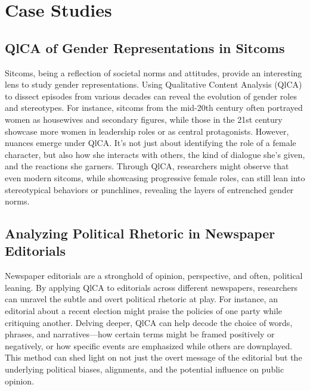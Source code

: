 \documentclass[
  b5paper]{book}
\begin{document}
\hypertarget{case-studies-2}{%
\section{Case Studies}\label{case-studies-2}}

\hypertarget{qlca-of-gender-representations-in-sitcoms}{%
\subsection*{QlCA of Gender Representations in Sitcoms}\label{qlca-of-gender-representations-in-sitcoms}}

Sitcoms, being a reflection of societal norms and attitudes, provide an interesting lens to study gender representations. Using Qualitative Content Analysis (QlCA) to dissect episodes from various decades can reveal the evolution of gender roles and stereotypes. For instance, sitcoms from the mid-20th century often portrayed women as housewives and secondary figures, while those in the 21st century showcase more women in leadership roles or as central protagonists. However, nuances emerge under QlCA. It's not just about identifying the role of a female character, but also how she interacts with others, the kind of dialogue she's given, and the reactions she garners. Through QlCA, researchers might observe that even modern sitcoms, while showcasing progressive female roles, can still lean into stereotypical behaviors or punchlines, revealing the layers of entrenched gender norms.

\hypertarget{analyzing-political-rhetoric-in-newspaper-editorials}{%
\subsection*{Analyzing Political Rhetoric in Newspaper Editorials}\label{analyzing-political-rhetoric-in-newspaper-editorials}}

Newspaper editorials are a stronghold of opinion, perspective, and often, political leaning. By applying QlCA to editorials across different newspapers, researchers can unravel the subtle and overt political rhetoric at play. For instance, an editorial about a recent election might praise the policies of one party while critiquing another. Delving deeper, QlCA can help decode the choice of words, phrases, and narratives---how certain terms might be framed positively or negatively, or how specific events are emphasized while others are downplayed. This method can shed light on not just the overt message of the editorial but the underlying political biases, alignments, and the potential influence on public opinion.
\end{document}
